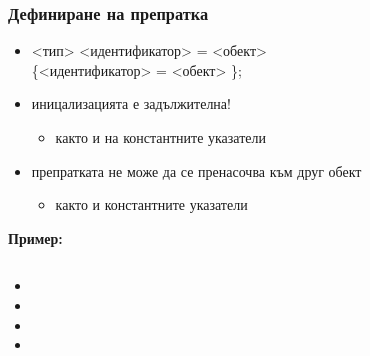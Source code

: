 \documentclass[alsotrans]{beamerswitch}
\newcommand{\labeledcell}[2]{
  \node [cell,label={\tt{#1}}] {\tt{#2}};
}
\begin{document}
\begin{frame}
  \frametitle{Дефиниране на препратка}

  \begin{itemize}[<+->]
  \item{} <тип>\tta{\&} <идентификатор> \tta= <обект>\\
    \hspace{5ex} \{\tta{, \&}<идентификатор> \tta= <обект> \}\tta;
  \item иницализацията е \alert{задължителна}!
    \begin{itemize}
    \item както и на константните указатели
    \end{itemize}
  \item препратката \alert{не може} да се пренасочва към друг обект
    \begin{itemize}
    \item както и константните указатели
    \end{itemize}
  \end{itemize}
  \onslide<+->
  \textbf{Пример:}
  \begin{columns}[T,onlytextwidth]
    \begin{column}{.5\textwidth}
      \begin{itemize}[<+->]
      \item {}
      \item {}
      \item {}
      \item {}
      \end{itemize}
    \end{column}
    \begin{column}{.5\textwidth}
      \only<7>{\tikz{\labeledcell{x}3}}%
      \only<8-10>{\tikz{\labeledcell{x,a}3}}%
      \only<11>{\tikz{\labeledcell{x,a}8}}%
      \hspace{5ex}%
      \only<8>{\tikz{\labeledcell{b}3}}%
      \only<9->{\tikz{\labeledcell{b,c}3}}
    \end{column}
  \end{columns}
\end{frame}
\end{document}

